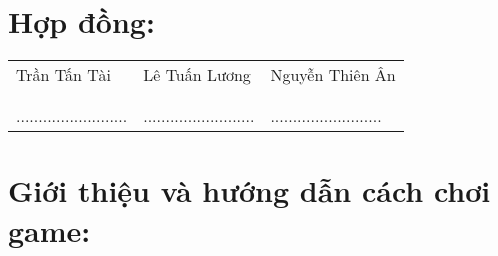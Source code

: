 \documentclass{article}
\begin{document}
\section{Hợp đồng:}
\begin{center}
\begin{tabular}{p{4cm}p{4cm}p{4cm}}
Trần Tấn Tài & Lê Tuấn Lương & Nguyễn Thiên Ân  \\
     &  & \\
             \\
.........................& .........................& ......................... \\     
\end{tabular}   
\end{center}


\newpage
\section{Giới thiệu và hướng dẫn cách chơi game:}
\Large
\end{document}
